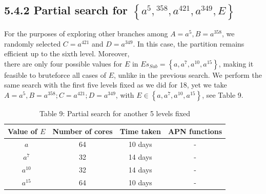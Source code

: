 \documentclass[10pt]{article}
\begin{document}
\subsection*{5.4.2 Partial search for $\left\{a^{5},{ }^{358}, a^{421}, a^{349}, E\right\}$}
For the purposes of exploring other branches among $A=a^{5}, B=a^{358}$, we randomly selected $C=a^{421}$ and $D=a^{349}$. In this case, the partition remains efficient up to the sixth level. Moreover,\\
there are only four possible values for $E$ in $E s_{S u b}=\left\{a, a^{7}, a^{10}, a^{15}\right\}$, making it feasible to bruteforce all cases of $E$, unlike in the previous search. We perform the same search with the first five levels fixed as we did for 18, yet we take $A=a^{5}, B=a^{358} ; C=a^{421} ; D=a^{349}$, with $E \in\left\{a, a^{7}, a^{10}, a^{15}\right\}$, see Table 9.

\begin{table}[h]
\begin{center}
\begin{tabular}{|c|c|c|c|}
\hline
Value of $E$ & Number of cores & Time taken & APN functions \\
\hline
$a$ & 64 & 10 days & - \\
$a^{7}$ & 32 & 14 days & - \\
$a^{10}$ & 32 & 14 days & - \\
$a^{15}$ & 64 & 10 days & - \\
\hline
\end{tabular}
\captionsetup{labelformat=empty}
\caption{Table 9: Partial search for another 5 levels fixed}
\end{center}
\end{table}
\end{document}
